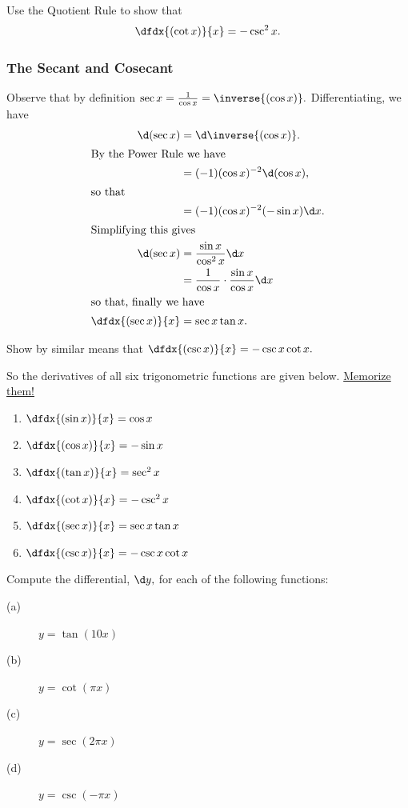 \begin{embeddedproblem}{}
  Use the Quotient Rule to show that 
\[
\dfdx{(\cot x)}{x} = -\csc^2x.
\]
\end{embeddedproblem}

\subsubsection*{The Secant and Cosecant}

Observe that by definition \(\sec x = \frac{1}{\cos x} = \inverse{(\cos
  x)}.\) Differentiating, we have
\begin{align*}
  \d(\sec x) &= \d\inverse{(\cos  x)}.\\
\intertext{By the Power Rule we have}
             &=(-1)(\cos x)^{-2}\d(\cos x),\\
\intertext{so that}
             &= (-1)(\cos x)^{-2}(-\sin x)\d x.\\
\intertext{Simplifying this gives}
  \d(\sec x) &= \frac{\sin x}{\cos^2x}\d x\\
  &= \frac{1}{\cos x}\cdot\frac{\sin x}{\cos x}\d x\\
\intertext{so that, finally we have}
\dfdx{(\sec x)}{x}   &= \sec x\tan x.
\end{align*}

\begin{embeddedproblem}{}
  Show by similar means that \(\dfdx{(\csc x)}{x} = -\csc x\cot x.\)
\end{embeddedproblem}

So the derivatives of all six trigonometric functions are given
below. \underline{\sc Memorize them!}
\begin{enumerate}
\item $\dfdx{ (\sin x)}{x} = \cos x $
\item $\dfdx{ (\cos x)}{x} = -\sin x $
\item $\dfdx{ (\tan x)}{x} = \sec^2 x $
\item $\dfdx{ (\cot x)}{x} = -\csc^2 x $
\item $\dfdx{ (\sec x)}{x} = \sec x\tan x $
\item $\dfdx{ (\csc x)}{x} = -\csc x\cot x $
\end{enumerate}


\begin{ProblemSection}
  Compute the differential, $\d y,$ for each of the following functions:
  \begin{multicols}{4}
    \begin{description}
    \item[(a)] $y=\tan(10x)$
    \item[(b)] $y=\cot(\pi x)$
    \item[(c)] $y=\sec(2\pi x)$
    \item[(d)] $y=\csc(-\pi x)$
    \end{description}
  \end{multicols}
\end{ProblemSection}

